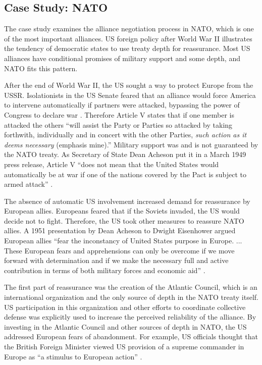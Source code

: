 \documentclass[12pt]{article}
\begin{document}
\subsection{Case Study: NATO}


The case study examines the alliance negotiation process in NATO, which is one of the most important alliances.
US foreign policy after World War II illustrates the tendency of democratic states to use treaty depth for reassurance. 
Most US alliances have conditional promises of military support and some depth, and NATO fits this pattern. 


After the end of World War II, the US sought a way to protect Europe from the USSR. 
Isolationists in the US Senate feared that an alliance would force America to intervene automatically if partners were attacked, bypassing the power of Congress to declare war \citep[pg. 280-1]{Acheson1969}.
Therefore Article V states that if one member is attacked the others ``will assist the Party or Parties so attacked by taking forthwith, individually and in concert with the other Parties, \emph{such action as it deems necessary} (emphasis mine).'' 
Military support was and is not guaranteed by the NATO treaty. 
As Secretary of State Dean Acheson put it in a March 1949 press release, Article V ``does not mean that the United States would automatically be at war if one of the nations covered by the Pact is subject to armed attack'' \citep{Acheson1949}. 


The absence of automatic US involvement increased demand for reassurance by European allies. 
Europeans feared that if the Soviets invaded, the US would decide not to fight. 
Therefore, the US took other measures to reassure NATO allies. 
A 1951 presentation by Dean Acheson to Dwight Eisenhower argued European allies ``fear the inconstancy of United States purpose in Europe. ... These European fears and apprehensions can only be overcome if we move forward with determination and if we make the necessary full and active contribution in terms of both military forces and economic aid'' \citep[pg. 3]{Acheson1951}. 


The first part of reassurance was the creation of the Atlantic Council, which is an international organization and the only source of depth in the NATO treaty itself. 
US participation in this organization and other efforts to coordinate collective defense was explicitly used to increase the perceived reliability of the alliance. 
By investing in the Atlantic Council and other sources of depth in NATO, the US addressed European fears of abandonment. 
For example, US officials thought that the British Foreign Minister viewed US provision of a supreme commander in Europe as ``a stimulus to European action'' \citep{Acheson1950}. 
\end{document}
